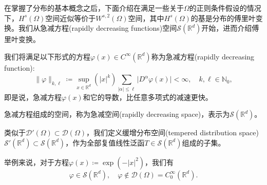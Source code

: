 在掌握了分布的基本概念之后，下面介绍在满足一些关于$\Omega$的正则条件假设的情况下，$H^{s}(\Omega)$空间近似等价于$W^{s,2}(\Omega)$空间，其中$H^{s}(\Omega)$的基是分布的傅里叶变换。我们从急减方程(rapidly decreasing functions)空间$\mathcal{S} \left( \mathbb{R}^d \right)$开始，进而介绍傅里叶变换。

\begin{definition}[急减方程空间]
  \label{definition:rapidly-decreasing-space}
  我们将满足以下形式的方程$\varphi(x) \in C^{\infty}(\mathbb{R}^d)$称为急减方程(rapidly decreasing function):
  \begin{equation*}
    \big\|  \varphi \big\|_{k,\ell} \coloneqq
    \sup_{x \in \mathbb{R}^d} \left( \left| x  \right|^k  \right)
    \sum_{\left| \alpha \right| \le \ell } \big| D^{\alpha} \varphi(x) \big| < \infty, \quad k,\ell \in \mathbb{N}_0,
  \end{equation*}
  即是说，急减方程$\varphi(x)$和它的导数，比任意多项式的减速更快。

  急减方程组成的空间，称为急减空间(rapidly decreasing space)，表示为$\mathcal{S}(\mathbb{R}^{d})$。

  类似于$\mathcal{D}'(\Omega) \subset \mathcal{D}(\Omega)$，我们定义缓增分布空间(tempered distribution space) $\mathcal{S}'(\mathbb{R}^d) \subset \mathcal{S}(\mathbb{R}^d)$，作为全部复值线性泛函$T \in \mathcal{S}(\mathbb{R}^{d})$组成的子集。
\end{definition}

举例来说，对于方程$\varphi(x) \coloneqq \exp(- \left| x \right|^2)$，我们有
\begin{equation*}
    \varphi \in \mathcal{S}(\mathbb{R}^d), \quad \varphi \notin \mathcal{D}(\Omega) = C_0^{\infty}(\mathbb{R}^d).
\end{equation*}

